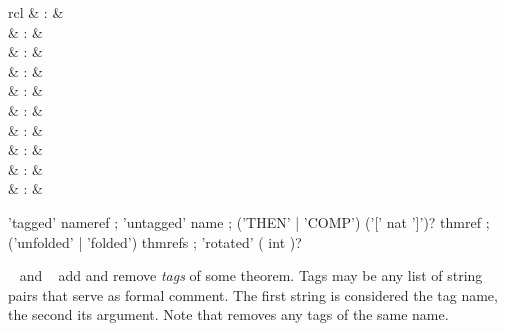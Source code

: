 \begin{isabellebody}
\begin{isamarkuptext}
  \begin{matharray}{rcl}
    \hypertarget{attribute.tagged}{\hyperlink{attribute.tagged}{\mbox{}}} & : & \isaratt \\
    \hypertarget{attribute.untagged}{\hyperlink{attribute.untagged}{\mbox{}}} & : & \isaratt \\[0.5ex]
    \hypertarget{attribute.THEN}{\hyperlink{attribute.THEN}{\mbox{}}} & : & \isaratt \\
    \hypertarget{attribute.COMP}{\hyperlink{attribute.COMP}{\mbox{}}} & : & \isaratt \\[0.5ex]
    \hypertarget{attribute.unfolded}{\hyperlink{attribute.unfolded}{\mbox{}}} & : & \isaratt \\
    \hypertarget{attribute.folded}{\hyperlink{attribute.folded}{\mbox{}}} & : & \isaratt \\[0.5ex]
    \hypertarget{attribute.rotated}{\hyperlink{attribute.rotated}{\mbox{}}} & : & \isaratt \\
    \hypertarget{attribute.Pure.elim_format}{\hyperlink{attribute.Pure.elim_format}{\mbox{}}} & : & \isaratt \\
    \hypertarget{attribute.standard}{\hyperlink{attribute.standard}{\mbox{}}}\isa{{\isachardoublequote}\isactrlsup {\isacharasterisk}{\isachardoublequote}} & : & \isaratt \\
    \hypertarget{attribute.no_vars}{\hyperlink{attribute.no_vars}{\mbox{}}}\isa{{\isachardoublequote}\isactrlsup {\isacharasterisk}{\isachardoublequote}} & : & \isaratt \\
  \end{matharray}

  \begin{rail}
    'tagged' nameref
    ;
    'untagged' name
    ;
    ('THEN' | 'COMP') ('[' nat ']')? thmref
    ;
    ('unfolded' | 'folded') thmrefs
    ;
    'rotated' ( int )?
  \end{rail}

  \begin{descr}

  \item [\hyperlink{attribute.tagged}{\mbox{\isa{tagged}}}~\isa{{\isachardoublequote}name\ arg{\isachardoublequote}} and \hyperlink{attribute.untagged}{\mbox{\isa{untagged}}}~\isa{name}] add and remove \emph{tags} of some theorem.
  Tags may be any list of string pairs that serve as formal comment.
  The first string is considered the tag name, the second its
  argument.  Note that \hyperlink{attribute.untagged}{\mbox{}} removes any tags of the
  same name.


\end{descr}
\end{isamarkuptext}
\end{isabellebody}
